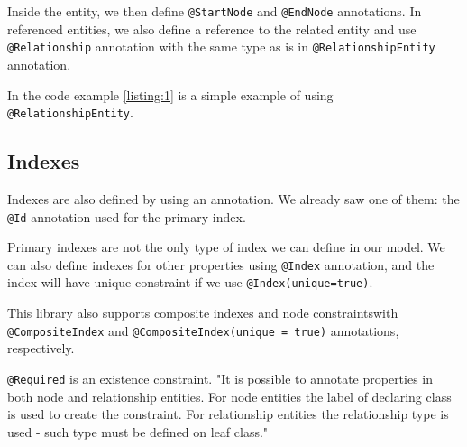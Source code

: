 Inside the entity, we then define \texttt{@StartNode} and \texttt{@EndNode} annotations.
In referenced entities, we also define a reference to the related entity and use \texttt{@Relationship} annotation with the same type as is in \texttt{@RelationshipEntity} annotation.

In the code example \ref{listing:1} is a simple example of using \texttt{@RelationshipEntity}.


\subsection {Indexes}

Indexes are also defined by using an annotation. We already saw one of them: the \texttt{@Id} annotation used for the primary index.

Primary indexes are not the only type of index we can define in our model.
We can also define indexes for other properties using \texttt{@Index} annotation, and the index will have unique constraint if we use \texttt{@Index(unique=true)}.

This library also supports composite indexes and node constraints\linebreak with \texttt{@CompositeIndex} and \texttt{@CompositeIndex(unique = true)} annotations, respectively.

\texttt{@Required} is an existence constraint. "It is possible to annotate properties in both node and relationship entities.
For node entities the label of declaring class is used to create the constraint.
For relationship entities the relationship type is used - such type must be defined on leaf class." \cite{neo4j_reference_nodate}


